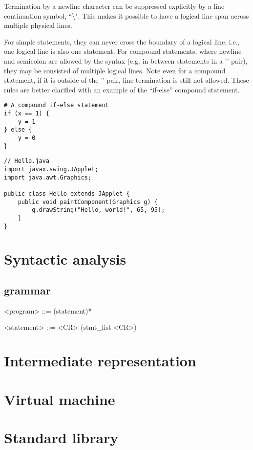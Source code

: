 \documentclass[10pt,a4paper]{article}
\begin{document}
Termination by a newline character can be suppressed explicitly by a line 
continuation symbol, ``\textbackslash". This makes it possible to have a 
logical line span across multiple physical lines. 

For simple statements, they can never cross the boundary of a logical line,
i.e., one logical line is also one statement. 
For compound statements, where newline and semicolon are allowed by the 
syntax (e.g. in between statements in a '{}' pair), they may be consisted 
of multiple logical lines. Note even for a compound statement, if it is
outside of the '{}' pair, line termination is still not allowed. These
rules are better clarified with an example of the ``if-else'' compound 
statement. 

\begin{lstlisting}
# A compound if-else statement
if (x == 1) {
    y = 1
} else {
    y = 0
}
\end{lstlisting}

\begin{lstlisting}
// Hello.java
import javax.swing.JApplet;
import java.awt.Graphics;

public class Hello extends JApplet {
    public void paintComponent(Graphics g) {
        g.drawString("Hello, world!", 65, 95);
    }    
}
\end{lstlisting}


\section{Syntactic analysis}
\subsection{grammar}

\setlength{\grammarparsep}{10pt plus 1pt minus 1pt} %
\setlength{\grammarindent}{12em} %
\begin{grammar}


<program> ::= (statement)*

<statement> ::= <CR> 
\alt (stmt_list <CR>)


\end{grammar}

\section{Intermediate representation}

\section{Virtual machine}

\section{Standard library}
\end{document}
